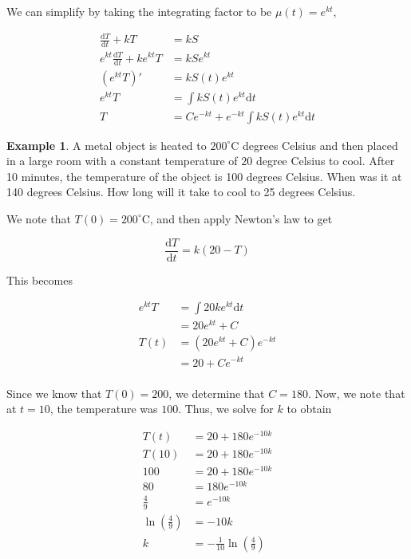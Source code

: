 \documentclass[11pt]{article}
\theoremstyle{plain} %
\theoremstyle{definition}
\theoremstyle{example}
\newtheorem*{example}{Example}
\theoremstyle{remark}
\begin{document}
We can simplify by taking the integrating factor to be $\mu (t) = e^{kt}$, 

\begin{align*}
	\frac{\mathrm d T}{\mathrm d t} +kT &= kS\\
	e^{kt}\frac{\mathrm d T}{\mathrm d t} +ke^{kt}T &= kSe^{kt}\\
	\left(e^{kt}T\right)' &= kS(t)e^{kt}\\
	e^{kt}T &= \int kS(t)e^{kt} \mathrm d t\\
	T &= Ce^{-kt}+e^{-kt}\int kS(t)e^{kt}\mathrm d t
\end{align*}



\begin{example}
A metal object is heated to $200^{\circ}\mathrm C$ degrees Celsius and then placed in a large room with a constant temperature of $20$ degree Celsius to cool. After 10 minutes, the temperature of the object is 100 degrees Celsius. When was it at 140 degrees Celsius. How long will it take to cool to 25 degrees Celsius. 
\end{example}

We note that $T(0)=200^{\circ}\mathrm C$, and then apply Newton's law to get

$$\frac{\mathrm d T}{\mathrm d t} = k(20-T)$$ 

This becomes 

\begin{align*}
e^{kt}T &= \int 20ke^{kt} \mathrm d t\\
	&= 20e^{kt} + C \\
	T(t) &= \left(20e^{kt}+C\right)e^{-kt}\\
	&= 20+Ce^{-kt} \\
\end{align*}

Since we know that $T(0) = 200$, we determine that $C = 180$. Now, we note that at $t=10$, the temperature was $100$. Thus, we solve for $k$ to obtain

\begin{align*}
T(t) &= 20+180e^{-10k}\\
T(10) &= 20 + 180e^{-10k}\\
100 &= 20+180e^{-10k}\\
80 &= 180e^{-10k}\\
\frac{4}{9} &= e^{-10k}\\
\ln\left(\frac{4}{9}\right) &= -10k\\
k &= -\frac{1}{10}\ln\left(\frac{4}{9}\right)
\end{align*}
\end{document}
